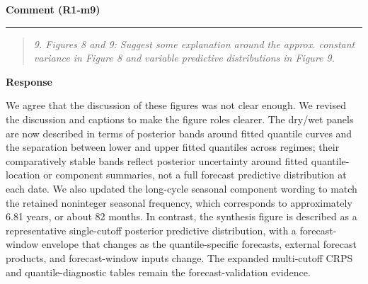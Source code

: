 \documentclass[11pt,letterpaper]{article}
\newcommand{\commentheading}[1]{%
  \vspace{6pt}\noindent\textbf{Comment (#1)}\par
  \vspace{2pt}\hrule\vspace{6pt}
}
\newenvironment{commentblock}{\begin{quote}\small\itshape}{\end{quote}}
\newcommand{\responseheading}{%
  \vspace{2pt}\noindent\textbf{Response}\par
}
\newenvironment{responsebox}{\begin{mdframed}[style=plainbox]}{\end{mdframed}}
\newcommand{\Ronem}[1]{R1-m#1}
\begin{document}
\commentheading{\Ronem{9}}
\begin{commentblock}
9. Figures 8 and 9: Suggest some explanation around the approx. constant variance in Figure 8 and variable predictive distributions in Figure 9.
\end{commentblock}
\responseheading
\begin{responsebox}
We agree that the discussion of these figures was not clear enough.
We revised the discussion and captions to make the figure roles clearer. The dry/wet panels are now described in terms of posterior bands around fitted quantile curves and the separation between lower and upper fitted quantiles across regimes; their comparatively stable bands reflect posterior uncertainty around fitted quantile-location or component summaries, not a full forecast predictive distribution at each date. We also updated the long-cycle seasonal component wording to match the retained noninteger seasonal frequency, which corresponds to approximately 6.81 years, or about 82 months. In contrast, the synthesis figure is described as a representative single-cutoff posterior predictive distribution, with a forecast-window envelope that changes as the quantile-specific forecasts, external forecast products, and forecast-window inputs change. The expanded multi-cutoff CRPS and quantile-diagnostic tables remain the forecast-validation evidence.

\end{responsebox}
\end{document}

